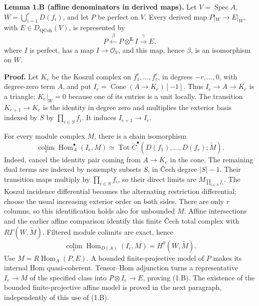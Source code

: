 \documentclass[11pt]{article}
\begin{document}
\textbf{Lemma 1.B (affine denominators in derived maps).} Let
\(V=\operatorname{Spec}A\), \(W=\bigcup_{i=1}^rD(f_i)\), and let \(P\)
be perfect on \(V\). Every derived map \(P|_W\to E|_W\), with
\(E\in D_{\mathrm{QCoh}}(V)\), is represented by \[
P\xleftarrow{\beta}P\otimes^{\mathbf L}I\xrightarrow{\gamma}E,
\tag{1.B}
\] where \(I\) is perfect, has a map \(I\to\mathcal O_V\), and this map,
hence \(\beta\), is an isomorphism on \(W\).

\textbf{Proof.} Let \(K_e\) be the Koszul complex on
\(f_1^e,\ldots,f_r^e\), in degrees \(-r,\ldots,0\), with degree-zero
term \(A\), and put \(I_e=\operatorname{Cone}(A\to K_e)[-1]\). Thus
\(I_e\to A\to K_e\) is a triangle; \(K_e|_W=0\) because one of its
entries is a unit locally. The transition \(K_{e+1}\to K_e\) is the
identity in degree zero and multiplies the exterior basis indexed by
\(S\) by \(\prod_{i\in S}f_i\). It induces \(I_{e+1}\to I_e\).

For every module complex \(M\), there is a chain isomorphism \[
\underset e{\operatorname{colim}}\operatorname{Hom}^{\bullet}_A(I_e,M)
\simeq\operatorname{Tot}\check C^{\bullet}(D(f_1),\ldots,D(f_r);\widetilde M).
\tag{1.C}
\] Indeed, cancel the identity pair coming from \(A\to K_e\) in the
cone. The remaining dual terms are indexed by nonempty subsets \(S\), in
Čech degree \(|S|-1\). Their transition maps multiply by
\(\prod_{i\in S}f_i\), so their direct limits are
\(M_{\prod_{i\in S}f_i}\). The Koszul incidence differential becomes the
alternating restriction differential; choose the usual increasing
exterior order on both sides. There are only \(r\) columns, so this
identification holds also for unbounded \(M\). Affine intersections and
the earlier affine comparison identify this finite Čech total complex
with \(R\Gamma(W,\widetilde M)\). Filtered module colimits are exact,
hence \[
\underset e{\operatorname{colim}}\operatorname{Hom}_{D(A)}(I_e,M)
=H^0(W,\widetilde M).
\tag{1.D}
\] Use \(M=R\operatorname{Hom}_A(P,E)\). A bounded finite-projective
model of \(P\) makes its internal Hom quasi-coherent. Tensor--Hom
adjunction turns a representative \(I_e\to M\) of the specified class
into \(P\otimes I_e\to E\), proving (1.B). The existence of the bounded
finite-projective affine model is proved in the next paragraph,
independently of this use of (1.B).
\end{document}
